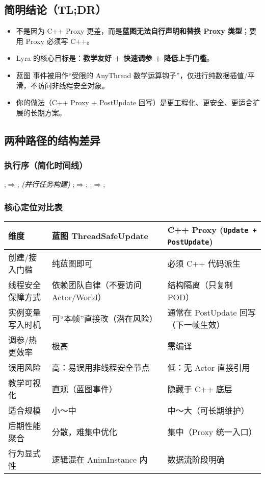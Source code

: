 \documentclass[10pt,openright,oneside,CJKmath]{MyBook}
\begin{document}
\subsection{简明结论（TL;DR）}
\begin{itemize}
  \item 不是因为 C++ Proxy 更差，而是\textbf{蓝图无法自行声明和替换 Proxy 类型}；要用 Proxy 必须写 C++。
  \item Lyra 的核心目标是：\textbf{教学友好 + 快速调参 + 降低上手门槛}。
  \item 蓝图  事件被用作“受限的 AnyThread 数学运算钩子”，仅进行纯数据插值/平滑，不访问非线程安全对象。
  \item 你的做法（C++ Proxy + PostUpdate 回写）是更工程化、更安全、更适合扩展的长期方案。
\end{itemize}

\subsection{两种路径的结构差异}
\subsubsection{执行序（简化时间线）}
;$\Rightarrow$; \emph{(并行任务构建)} 
;$\Rightarrow$; 
;$\Rightarrow$; 

\subsubsection{核心定位对比表}
\begin{center}
\begin{tabular}{p{3.2cm} | p{5.2cm} | p{5.5cm}}
\toprule
维度 & 蓝图 ThreadSafeUpdate & C++ Proxy (\texttt{Update + PostUpdate}) \\
\midrule
创建/接入门槛 & 纯蓝图即可 & 必须 C++ 代码派生 \\
线程安全保障方式 & 依赖团队自律（不要访问 Actor/World） & 结构隔离（只复制 POD） \\
实例变量写入时机 & 可“本帧”直接改（潜在风险） & 通常在 PostUpdate 回写（下一帧生效） \\
调参/热更效率 & 极高 & 需编译 \\
误用风险 & 高：易误用非线程安全节点 & 低：无 Actor 直接引用 \\
教学可视化 & 直观（蓝图事件） & 隐藏于 C++ 底层 \\
适合规模 & 小～中 & 中～大（可长期维护） \\
后期性能聚合 & 分散，难集中优化 & 集中（Proxy 统一入口） \\
行为显式性 & 逻辑混在 AnimInstance 内 & 数据流阶段明确 \\
\bottomrule
\end{tabular}
\end{center}
\end{document}
